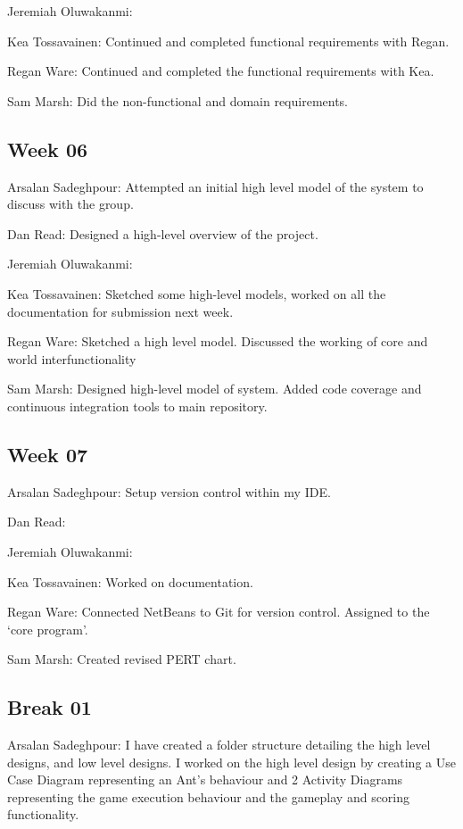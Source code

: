 \documentclass[11pt]{article}
\begin{document}
Jeremiah Oluwakanmi:

Kea Tossavainen: Continued and completed functional requirements with Regan.

Regan Ware: Continued and completed the functional requirements with Kea.

Sam Marsh: Did the non-functional and domain requirements.

\subsection{Week 06}

Arsalan Sadeghpour: Attempted an initial high level model of the system to discuss with the group.

Dan Read: Designed a high-level overview of the project.

Jeremiah Oluwakanmi:

Kea Tossavainen: Sketched some high-level models, worked on all the documentation for submission next week.

Regan Ware: Sketched a high level model. Discussed the working of core and world interfunctionality

Sam Marsh: Designed high-level model of system. Added code coverage and continuous integration tools to main repository.

\subsection{Week 07}

Arsalan Sadeghpour: Setup version control within my IDE.

Dan Read:

Jeremiah Oluwakanmi:

Kea Tossavainen: Worked on documentation.

Regan Ware: Connected NetBeans to Git for version control. Assigned to the `core program'.

Sam Marsh: Created revised PERT chart.

\subsection{Break 01}

Arsalan Sadeghpour: I have created a folder structure detailing the high level designs, and low level designs. I worked on the high level design by creating a Use Case Diagram representing an Ant's behaviour and 2 Activity Diagrams representing the game execution behaviour and the gameplay and scoring functionality.
\end{document}
